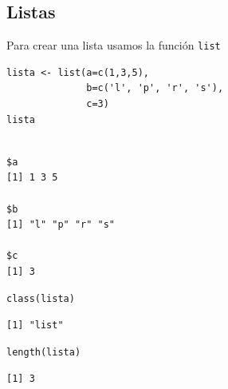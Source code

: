 \documentclass[aspectratio=169, usenames,svgnames,dvipsnames]{beamer}
\begin{document}
\subsection{Listas}
\label{sec:org3cfcc63}
\begin{frame}[label={sec:org722a9a9},fragile]{Para crear una lista usamos la función \texttt{list}}
 \lstset{language=r,label= ,caption= ,captionpos=b,numbers=none}
\begin{lstlisting}
lista <- list(a=c(1,3,5),
              b=c('l', 'p', 'r', 's'),
              c=3)
lista
\end{lstlisting}

\begin{verbatim}

$a
[1] 1 3 5

$b
[1] "l" "p" "r" "s"

$c
[1] 3
\end{verbatim}


\lstset{language=r,label= ,caption= ,captionpos=b,numbers=none}
\begin{lstlisting}
class(lista)
\end{lstlisting}

\begin{verbatim}
[1] "list"
\end{verbatim}


\lstset{language=r,label= ,caption= ,captionpos=b,numbers=none}
\begin{lstlisting}
length(lista)
\end{lstlisting}

\begin{verbatim}
[1] 3
\end{verbatim}
\end{frame}
\end{document}
